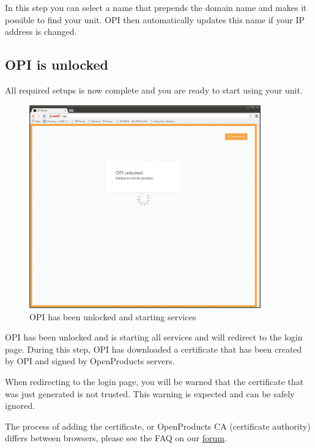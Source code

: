 \documentclass[12pt,a4paper,titlepage]{article}
\begin{document}
In this step you can select a name that prepends the domain name and makes it possible to find your unit. OPI then automatically updates this name if your IP address is changed.

\newpage
\subsection{OPI is unlocked}
All required setups is now complete and you are ready to start using your unit.
\begin{figure}[h]
\centering
\includegraphics[width=10cm]{./img/unlocked}
\caption{OPI has been unlocked and starting services}
\end{figure}
OPI has been unlocked and is starting all services and will redirect to the login page.
During this step, OPI has downloaded a certificate that has been created by OPI and signed by OpenProducts servers.

When redirecting to the login page, you will be warned that the certificate that was just generated is not trusted. This warning is expected and can be safely ignored.

The process of adding the certificate, or OpenProducts CA (certificate authority) differs between browsers, please see the FAQ on our  \href{http://community.openproducts.com}{forum}. 

\newpage
\end{document}
